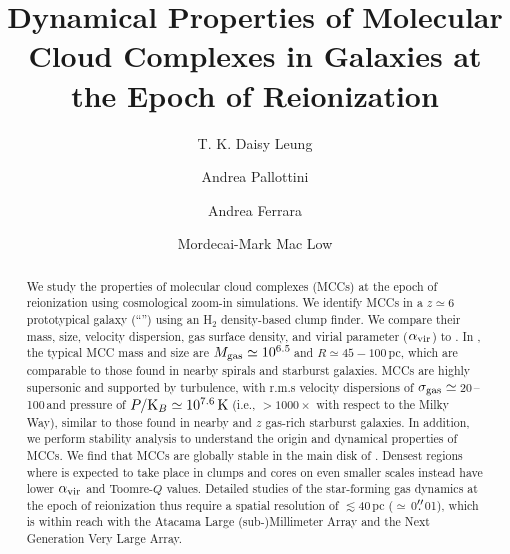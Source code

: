 \IfFileExists{emulateapjlegacy.cls}{\documentclass[iop]{emulateapjlegacy}}{\documentclass[iop]{emulateapj}}
\begin{document}
\title{Dynamical Properties of Molecular Cloud Complexes in Galaxies at the Epoch of Reionization}

\author{T. K. Daisy Leung}
\author{Andrea Pallottini}
\author{Andrea Ferrara}
\author{Mordecai-Mark Mac Low}


\begin{abstract}
We study the properties of molecular cloud complexes (MCCs) at the epoch of reionization using cosmological zoom-in simulations. We identify MCCs in a $z\simeq 6$ prototypical galaxy (``\flower'') using an H$_2$ density-based clump finder.
%
We compare their mass, size, velocity dispersion, gas surface density, and virial parameter ($\alpha_{\rm vir}$) to \obs. In \flower, the typical MCC mass and size are $M_{\rm gas} \simeq 10^{6.5}$\,\Msun and $R\simeq45-100$\,pc, which are comparable to those found in nearby spirals and starburst galaxies. MCCs are highly supersonic and supported by turbulence, with r.m.s velocity dispersions of $\sigma_{\rm gas}\simeq$\,20\,--\,100\,\kms and pressure of $P/{\rm K}_B\simeq 10^{7.6}\,\rm K\,$\cc (i.e., $> 1000 \times$ with respect to the Milky Way), similar to those found in nearby and $z$ gas-rich starburst galaxies.
%
In addition, we perform stability analysis to understand the origin and dynamical properties of MCCs. We find that MCCs are globally stable in the main disk of \flower. Densest regions where \SF is expected to take place in clumps and cores on even smaller scales instead  have lower $\alpha_{\rm vir}$ and Toomre-$Q$ values.
%
Detailed studies of the star-forming gas dynamics at the epoch of reionization thus require a spatial resolution of $\lesssim$40\,pc ($\simeq$\,0$\mbox{$.\!\!^{\prime\prime}$}$01), which is within reach with the Atacama Large (sub-)Millimeter Array %
and the Next Generation Very Large Array.
\end{abstract}
\end{document}
